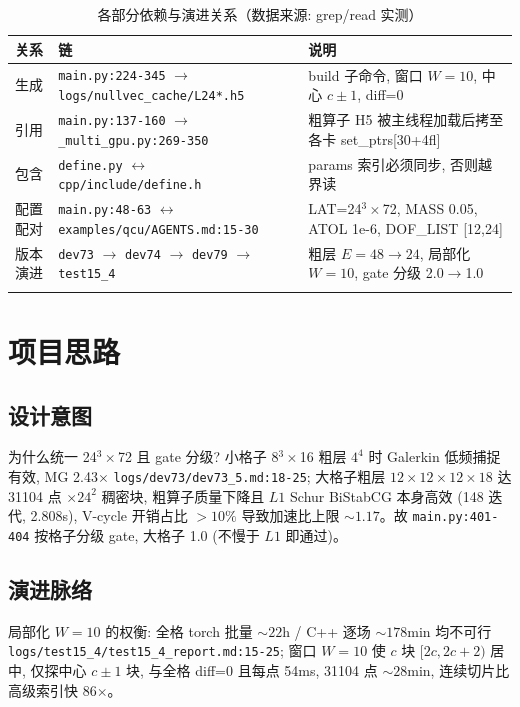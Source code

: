 \documentclass[UTF8]{ctexart}
\begin{document}
\begin{xltabular}{\textwidth}{llX}
\toprule
关系 & 链 & 说明 \\
\midrule
\endhead
生成 & \texttt{\nolinkurl{main.py:224-345}} $\to$ \texttt{\nolinkurl{logs/nullvec_cache/L24*.h5}} & build 子命令, 窗口 $W=10$, 中心 $c\pm1$, diff=0 \\
引用 & \texttt{\nolinkurl{main.py:137-160}} $\to$ \texttt{\nolinkurl{_multi_gpu.py:269-350}} & 粗算子 H5 被主线程加载后拷至各卡 set\_ptrs[30+4fl] \\
包含 & \texttt{\nolinkurl{define.py}} $\leftrightarrow$ \texttt{\nolinkurl{cpp/include/define.h}} & params 索引必须同步, 否则越界读 \\
配置配对 & \texttt{\nolinkurl{main.py:48-63}} $\leftrightarrow$ \texttt{\nolinkurl{examples/qcu/AGENTS.md:15-30}} & LAT=24$^3\times$72, MASS 0.05, ATOL 1e-6, DOF\_LIST [12,24] \\
版本演进 & \texttt{\nolinkurl{dev73}} $\to$ \texttt{\nolinkurl{dev74}} $\to$ \texttt{\nolinkurl{dev79}} $\to$ \texttt{\nolinkurl{test15_4}} & 粗层 $E=48\to24$, 局部化 $W=10$, gate 分级 2.0$\to$1.0 \\
\bottomrule
\caption{各部分依赖与演进关系（数据来源: grep/read 实测）}
\end{xltabular}

\section{项目思路}
\subsection{设计意图}
\textcolor{idea}{为什么统一 24$^3\times$72 且 gate 分级?} 小格子 8$^3\times$16 粗层 $4^4$ 时 Galerkin 低频捕捉有效, MG 2.43$\times$ \textcolor{evidence}{\texttt{\nolinkurl{logs/dev73/dev73_5.md:18-25}}}; 大格子粗层 $12\times12\times12\times18$ 达 31104 点 $\times 24^2$ 稠密块, 粗算子质量下降且 $L1$ Schur BiStabCG 本身高效 (148 迭代, 2.808s), V-cycle 开销占比 $>10\%$ 导致加速比上限 $\sim1.17$。故 \texttt{\nolinkurl{main.py:401-404}} 按格子分级 gate, 大格子 1.0 (不慢于 $L1$ 即通过)。

\subsection{演进脉络}
\textcolor{idea}{局部化 $W=10$ 的权衡:} 全格 torch 批量 $\sim22$h / C++ 逐场 $\sim178$min 均不可行 \textcolor{evidence}{\texttt{\nolinkurl{logs/test15_4/test15_4_report.md:15-25}}}; 窗口 $W=10$ 使 $c$ 块 $[2c,2c+2)$ 居中, 仅探中心 $c\pm1$ 块, 与全格 diff=0 且每点 54ms, 31104 点 $\sim28$min, 连续切片比高级索引快 86$\times$。
\end{document}
